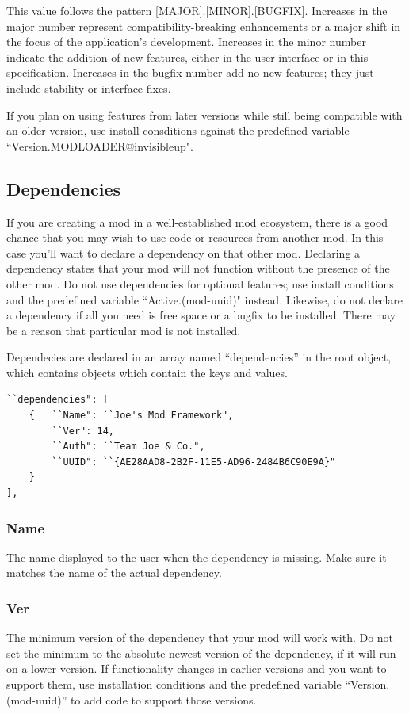 \documentclass[12pt,a4paper,notitlepage]{article}
\begin{document}
This value follows the pattern [MAJOR].[MINOR].[BUGFIX]. Increases in the major number represent compatibility-breaking enhancements or a major shift in the focus of the application's development. Increases in the minor number indicate the addition of new features, either in the user interface or in this specification. Increases in the bugfix number add no new features; they just include stability or interface fixes.

If you plan on using features from later versions while still being compatible with an older version, use install consditions against the predefined variable ``Version.MODLOADER@invisibleup".

\subsection{Dependencies}
\label{subsec:create-depend}
If you are creating a mod in a well-established mod ecosystem, there is a good chance that you may wish to use code or resources from another mod. In this case you'll want to declare a dependency on that other mod. Declaring a dependency states that your mod will not function without the presence of the other mod. Do not use dependencies for optional features; use install conditions and the predefined variable ``Active.(mod-uuid)" instead. Likewise, do not declare a dependency if all you need is free space or a bugfix to be installed. There may be a reason that particular mod is not installed.

Dependecies are declared in an array named ``dependencies'' in the root object, which contains objects which contain the keys and values.

\begin{lstlisting}[breaklines=true]
``dependencies": [
    {	``Name": ``Joe's Mod Framework",
        ``Ver": 14,
        ``Auth": ``Team Joe & Co.",
        ``UUID": ``{AE28AAD8-2B2F-11E5-AD96-2484B6C90E9A}"
    }
],
\end{lstlisting}

\subsubsection{Name}
\label{subsubsec:create-depend-name}
The name displayed to the user when the dependency is missing. Make sure it matches the name of the actual dependency.

\subsubsection{Ver}
\label{subsubsec:create-depend-ver}
The minimum version of the dependency that your mod will work with. Do not set the minimum to the absolute newest version of the dependency, if it will run on a lower version. If functionality changes in earlier versions and you want to support them, use installation conditions and the predefined variable ``Version.(mod-uuid)'' to add code to support those versions.
\end{document}
